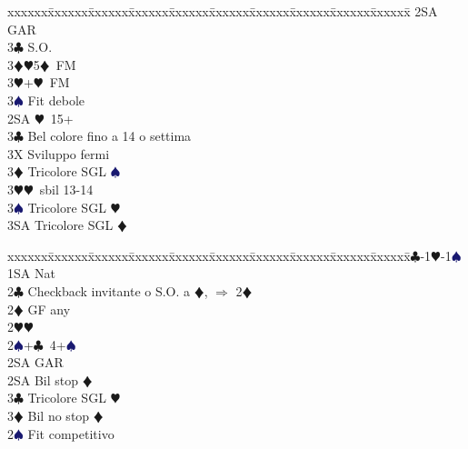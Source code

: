 \documentclass[a4paper,italian]{article}
\newcommand{\BC}{\textcolor{OliveGreen}{$\clubsuit$}}
\newcommand{\BD}{\textcolor{RedOrange}{$\vardiamondsuit$}}
\newcommand{\BH}{\textcolor{Red2}{$\varheartsuit${}}}
\newcommand{\BS}{\textcolor{MidnightBlue}{$\spadesuit${}}}
\newenvironment{bidtable}
{\begin{tabbing}

    xxxxxx\=xxxxxx\=xxxxxx\=xxxxxx\=xxxxxx\=xxxxxx\=xxxxxx\=xxxxxx\=xxxxxx\=xxxxxx\=\kill}
{\end{tabbing} }%
\begin{document}
\begin{multicols}{2}
\begin{bidtable}
                                        2SA \> GAR\\
                                        3\BC \> S.O.\\
                                        3\BD {}\BH 5\BD\ FM\\
                                        3\BH {}+\BH\ FM\\
                                        3\BS \> Fit debole\-\\
                                        2SA \BH\ 15+\\
                                        3\BC \> Bel colore fino a 14 o settima\+\\
                                        3X \> Sviluppo fermi\-\\
                                        3\BD \> Tricolore SGL \BS \\
                                        3\BH {}\BH\ sbil 13-14\\
                                        3\BS \> Tricolore SGL \BH \\
                                        3SA \> Tricolore SGL \BD \-
                                    \end{bidtable}
                                    \bigbreak
                                    \begin{bidtable}
                                        1\BC-1\BH-1\BS\+\\
                                        1SA \> Nat\\
                                        2\BC \> Checkback invitante o S.O. a \BD , $\Rightarrow$ 2\BD \\
                                        2\BD \> GF any\+\\
                                        2\BH {}\BH \\
                                        2\BS {}+\BC\ 4+\BS \+\\
                                        2SA \> GAR\-\\
                                        2SA \> Bil stop \BD \\
                                        3\BC \> Tricolore SGL \BH \\
                                        3\BD \> Bil no stop \BD \-\\
                                        [2pt]2\BS \> Fit competitivo\\

\end{bidtable}
\end{multicols}
\end{document}
